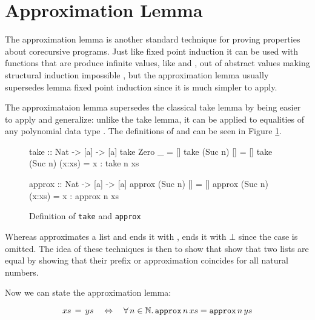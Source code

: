 \section{Approximation Lemma}
\label{sec:approx}

The approximation lemma is another standard technique for proving
properties about corecursive programs. Just like fixed point induction
it can be used with functions that are produce infinite values, like
 and , out of abstract values making structural
induction impossible \cite{corecursive}, but the approximation lemma
usually supersedes lemma fixed point induction since it is much
simpler to apply.

The approximataion lemma supersedes the classical take lemma
\cite{introfp} by being easier to apply and generalize: unlike the
take lemma, it can be applied to equalities of any polynomial data
type \cite{genapprox}. The definitions of  and 
can be seen in Figure \ref{code:takeapprox}.

\begin{figure}[h!]
\centering
\begin{minipage}[b]{6.2cm}
\begin{code}
take :: Nat -> [a] -> [a]
take Zero    _      = []
take (Suc n) []     = []
take (Suc n) (x:xs) = x : take n xs
\end{code}
\end{minipage}
\hspace{10pt}
\begin{minipage}[b]{6.7cm}
\begin{code}
approx :: Nat -> [a] -> [a]
approx (Suc n) []     = []
approx (Suc n) (x:xs) = x : approx n xs
\end{code}
\end{minipage}
\caption{Definition of \texttt{take} and \texttt{approx}
\label{code:takeapprox}
}
\end{figure}

Whereas  approximates a list and ends it with \hs{[]},
 ends it with $\bot$ since the  case is
omitted. The idea of these techniques is then to show that show that
two lists are equal by showing that their prefix or approximation
coincides for all natural numbers.

\pagebreak
Now we can state the approximation lemma:

\begin{equation}
\label{eq:approxeq}
xs \, = \, ys \quad \Leftrightarrow \quad \fa{n \in \mathbb{N}} \hs{approx} \, n \, xs = \hs{approx} \, n \, ys
\end{equation}

